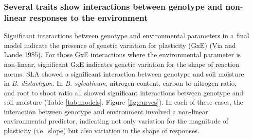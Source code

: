 \documentclass[jou,floatsintext]{apa6}
\begin{document}
\hypertarget{several-traits-show-interactions-between-genotype-and-non-linear-responses-to-the-environment}{%
\subsubsection{Several traits show interactions between genotype and non-linear responses to the environment}\label{several-traits-show-interactions-between-genotype-and-non-linear-responses-to-the-environment}}

Significant interactions between genotype and environmental parameters in a final model indicate the presence of genetic variation for plasticity (GxE) (Via and Lande 1985). For those GxE interactions where the environmental parameter is non-linear, significant GxE indicates genetic variation for the shape of reaction norms. SLA showed a significant interaction between genotype and soil moisture in \emph{B. distachyon}. In \emph{B. sylvaticum}, nitrogen content, carbon to nitrogen ratio, and root to shoot ratio all showed significant interactions between genotype and soil moisture (Table \ref{tab:models}, Figure \ref{fig:curves}). In each of these cases, the interaction between genotype and environment involved a non-linear environmental predictor, indicating not only variation for the magnitude of plasticity (i.e.~slope) but also variation in the shape of responses.
\end{document}

